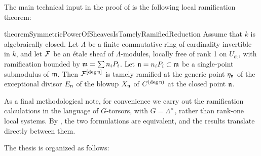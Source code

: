 

The main technical input in the proof of  is the following local ramification theorem:

\begin{restatable}{theorem}{SymmetricPowerOfSheavesIsTamelyRamifiedReduction}\label{theorem:SymmetricPowerOfSheavesIsTamelyRamifiedReduction}
     Assume that $k$ is algebraically closed.
     Let $\Lambda$ be a finite commutative ring of cardinality invertible in $k$, and let $\mathcal{F}$ be an \'etale sheaf of $\Lambda$-modules, locally free of rank 1 on $U_{\text{\'et}}$, with ramification bounded by $\mathfrak{m} = \sum n_i P_i$. 
     Let $\mathfrak{n} = n_i P_i \subset \mathfrak{m}$ be a single-point submodulus of $\mathfrak{m}$.
     Then $\mathcal{F}^{[\deg \mathfrak{n}]}$ is tamely ramified at the generic point $\eta_{\mathfrak{n}}$ of the exceptional divisor $E_{\mathfrak{n}}$ 
     of the blowup $X_{\mathfrak{n}}$ of $C^{(\deg \mathfrak{n})}$ at the closed point $\mathfrak{n}$.
\end{restatable}

As a final methodological note, for convenience we carry out the ramification calculations in the language of $G$-torsors, with $G=\Lambda^\times$, rather than rank-one local systems.
By , the two formulations are equivalent, and the results translate directly between them.

The thesis is organized as follows:


